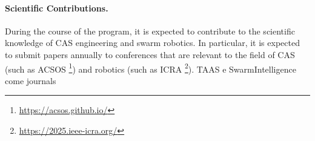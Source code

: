 \documentclass[12pt]{article}
\begin{document}
\paragraph{Scientific Contributions.}
During the course of the program, it is expected to contribute to the scientific knowledge of CAS engineering and swarm robotics. 
In particular, it is expected to submit papers annually to conferences that are relevant to the field of CAS (such as ACSOS \footnote{\url{https://acsos.github.io/}}) and robotics (such as ICRA \footnote{\url{https://2025.ieee-icra.org/}}).
TAAS e SwarmIntelligence come journals 
\clearpage

\renewcommand{\refname}{References}



\end{document}
